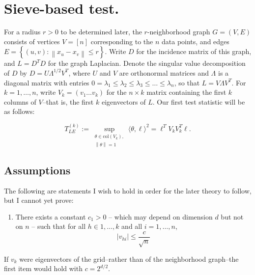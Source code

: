\documentclass{article}
\newcommand{\norm}[1]{\left\lVert#1\right\rVert}
\newcommand{\abs}[1]{\left \lvert #1 \right \rvert}
\newcommand{\set}[1]{\left\{#1\right\}}
\newcommand{\dotp}[2]{\langle #1, #2 \rangle}
\newcommand{\1}{\mathbb{I}}
\theoremstyle{alden}
\theoremstyle{aldenthm}
\theoremstyle{definition}
\theoremstyle{remark}
\begin{document}
\section{Sieve-based test.}

For a radius $r > 0$ to be determined later, the $r$-neighborhood graph $G = (V,E)$ consists of vertices $V = [n]$ corresponding to the $n$ data points, and edges $E = \set{(u,v): \norm{x_u - x_v} \leq r}$. Write $D$ for the incidence matrix of this graph, and $L = D^T D$ for the graph Laplacian. Denote the singular value decomposition of $D$ by $D = U \Lambda^{1/2} V^T$, where $U$ and $V$ are orthonormal matrices and $\Lambda$ is a diagonal matrix with entries $0 = \lambda_1 \leq \lambda_2 \leq \lambda_3 \leq \ldots \leq \lambda_n$, so that $L = V \Lambda V^T$. For $k = 1,\ldots,n$, write $V_k = (v_1 \ldots v_k)$ for the $n \times k$ matrix containing the first $k$ columns of $V$--that is, the first $k$ eigenvectors of $L$. Our first test statistic will be as follows:

\begin{equation}
\label{eqn: laplacian_eigenmaps_statistic}
T_{LE}^{(k)} := \sup_{\substack{\theta \in \mathrm{col}(V_k), \\ \norm{\theta} = 1} } \dotp{\theta}{\ell}^2 = \ell^T V_k V_k^T \ell.
\end{equation} 

\subsection{Assumptions}
The following are statements I wish to hold in order for the later theory to follow, but I cannot yet prove:
\begin{enumerate}
	\item There exists a constant $c_1 > 0$ -- which may depend on dimension $d$ but not on $n$ --  such that for all $h \in 1, \ldots,k$ and all $i = 1,\ldots,n$, 
	\begin{equation}
	\label{eqn: asmp_1}
	\abs{v_{hi}} \leq \frac{c}{\sqrt{n}}
	\end{equation}
\end{enumerate}

If $v_k$ were eigenvectors of the grid--rather than of the neighborhood graph--the first item would hold with $c = 2^{d/2}$.
\end{document}
